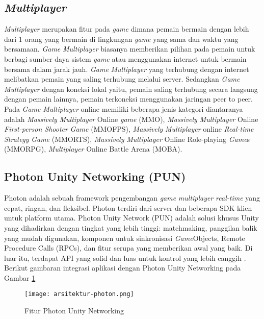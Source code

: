 \subsection{\textit{Multiplayer}}
\noindent

\textit{Multiplayer} merupakan fitur pada \textit{game} dimana pemain bermain dengan lebih dari 1 orang yang bermain 
di lingkungan \textit{game} yang sama dan waktu yang bersamaan. \textit{Game} \textit{Multiplayer} biasanya memberikan pilihan pada 
pemain untuk berbagi sumber daya sistem \textit{game} atau menggunakan internet untuk bermain bersama dalam jarak 
jauh. \textit{Game} \textit{Multiplayer} yang terhubung dengan internet melibatkan pemain yang saling terhubung melalui server. 
Sedangkan \textit{Game} \textit{Multiplayer} dengan koneksi lokal yaitu, pemain saling terhubung secara langsung dengan 
pemain lainnya, pemain terkoneksi menggunakan jaringan peer to peer. Pada \textit{Game} \textit{Multiplayer} online memiliki 
beberapa jenis kategori diantaranya adalah \textit{Massively} \textit{Multiplayer} Online \textit{game} (MMO), \textit{Massively} \textit{Multiplayer} 
Online \textit{First-person Shooter} \textit{Game} (MMOFPS), \textit{Massively} \textit{Multiplayer} online \textit{Real-time Strategy} \textit{Game}
(MMORTS), \textit{Massively} \textit{Multiplayer} Online Role-playing \textit{Game}s (MMORPG), \textit{Multiplayer} Online Battle Arena
(MOBA)\cite{Ansori}. 

\subsection{Photon Unity Networking (PUN)}
\noindent

Photon adalah sebuah framework pengembangan \textit{game} \textit{multiplayer} \textit{real-time} yang cepat, ringan, dan fleksibel. Photon terdiri dari server dan beberapa SDK klien untuk platform utama.
Photon Unity Network (PUN) adalah solusi khusus Unity yang dihadirkan dengan tingkat yang lebih tinggi: matchmaking, panggilan balik yang mudah digunakan, komponen untuk sinkronisasi \textit{Game}Objects, Remote Procedure Calls (RPCs), dan fitur serupa yang memberikan awal yang baik. Di luar itu, terdapat API yang solid dan luas untuk kontrol yang lebih canggih \cite{pun}.
Berikut gambaran 
integrasi aplikasi dengan Photon Unity Networking pada Gambar \ref{fig:photonni}
\begin{figure}[ht]
	\centering
	\texttt{[image: arsitektur-photon.png]}
	\caption{Fitur Photon Unity Networking}
	\label{fig:photonni}
\end{figure}
